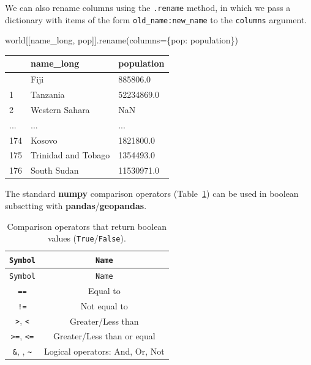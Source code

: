 \documentclass[
  letterpaper,
]{krantz}
\newenvironment{Shaded}{\begin{snugshade}}{\end{snugshade}}
\newcommand{\NormalTok}[1]{\textcolor[rgb]{0.00,0.23,0.31}{#1}}
\newcommand{\OperatorTok}[1]{\textcolor[rgb]{0.37,0.37,0.37}{#1}}
\newcommand{\StringTok}[1]{\textcolor[rgb]{0.13,0.47,0.30}{#1}}
\begin{document}
We can also rename columns using the \texttt{.rename} method, in which
we pass a dictionary with items of the form \texttt{old\_name:new\_name}
to the \texttt{columns} argument.

\begin{Shaded}
\begin{Highlighting}[]
\NormalTok{world[[}\StringTok{\textquotesingle{}name\_long\textquotesingle{}}\NormalTok{, }\StringTok{\textquotesingle{}pop\textquotesingle{}}\NormalTok{]].rename(columns}\OperatorTok{=}\NormalTok{\{}\StringTok{\textquotesingle{}pop\textquotesingle{}}\NormalTok{: }\StringTok{\textquotesingle{}population\textquotesingle{}}\NormalTok{\})}
\end{Highlighting}
\end{Shaded}

\begin{longtable}[]{@{}lll@{}}
\toprule\noalign{}
& name\_long & population \\
\midrule\noalign{}
\endhead
\bottomrule\noalign{}
\endlastfoot
0 & Fiji & 885806.0 \\
1 & Tanzania & 52234869.0 \\
2 & Western Sahara & NaN \\
... & ... & ... \\
174 & Kosovo & 1821800.0 \\
175 & Trinidad and Tobago & 1354493.0 \\
176 & South Sudan & 11530971.0 \\
\end{longtable}

The standard \textbf{numpy} comparison operators
(Table~\ref{tbl-comparison-operators}) can be used in boolean subsetting
with \textbf{pandas}/\textbf{geopandas}.

\begin{longtable}[]{@{}cc@{}}
\caption{Comparison operators that return boolean values
(\texttt{True}/\texttt{False}).}\label{tbl-comparison-operators}\tabularnewline
\toprule\noalign{}
\texttt{Symbol} & \texttt{Name} \\
\midrule\noalign{}
\endfirsthead
\toprule\noalign{}
\texttt{Symbol} & \texttt{Name} \\
\midrule\noalign{}
\endhead
\bottomrule\noalign{}
\endlastfoot
\texttt{==} & Equal to \\
\texttt{!=} & Not equal to \\
\texttt{\textgreater{}}, \texttt{\textless{}} & Greater/Less than \\
\texttt{\textgreater{}=}, \texttt{\textless{}=} & Greater/Less than or
equal \\
\texttt{\&}, \texttt{\textbar{}}, \texttt{\textasciitilde{}} & Logical
operators: And, Or, Not \\
\end{longtable}
\end{document}
